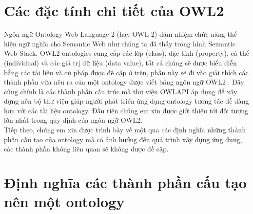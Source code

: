 \section{Các đặc tính chi tiết của OWL2}
Ngôn ngữ Ontology Web Language 2 (hay OWL 2) đảm nhiệm chức năng thể hiện ngữ nghĩa cho Semantic Web như chúng ta đã thấy trong hình Semantic Web  Stack. OWL2 ontologies cung cấp các lớp (class), đặc tính (property), cá thể (individual) và các giá trị dữ liệu (data value), tất cả chúng sẽ được biểu diễn bằng các tài liệu và cú pháp được đề cập ở trên, phần này sẽ đi vào giải thích các thành phần vừa nêu ra của một ontology được viết bằng ngôn ngữ OWL2 . Đây cũng chính là các thành phần cấu trúc mà thư viện OWLAPI \cite{owlapi} áp dụng để xây dựng nên bộ thư viện giúp người phát triển ứng dụng ontology tương tác dễ dàng hơn với các tài liệu ontology.
Đầu tiên chúng em xin được giới thiệu tới đối tượng lớn nhất trong quy định của ngôn ngữ OWL2. 
\\
Tiếp theo, chúng em xin được trình bày về một qua các định nghĩa những thành phần cấu tạo của ontology mà có ảnh hướng đến quá trình xây dựng ứng dụng, các thành phần không liên quan sẽ không được đề cập.
\section{Định nghĩa các thành phần cấu tạo nên một ontology}
